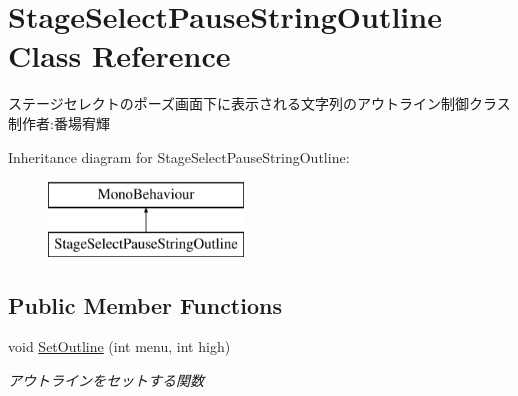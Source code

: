 \hypertarget{class_stage_select_pause_string_outline}{}\section{Stage\+Select\+Pause\+String\+Outline Class Reference}
\label{class_stage_select_pause_string_outline}


ステージセレクトのポーズ画面下に表示される文字列のアウトライン制御クラス 制作者\+:番場宥輝  


Inheritance diagram for Stage\+Select\+Pause\+String\+Outline\+:\begin{figure}[H]
\begin{center}
\leavevmode
\includegraphics[height=2.000000cm]{class_stage_select_pause_string_outline}
\end{center}
\end{figure}
\subsection*{Public Member Functions}
\begin{DoxyCompactItemize}
\item 
void \hyperlink{class_stage_select_pause_string_outline_a575ce9364ec9f4bdd5a297aeaaa2182d}{Set\+Outline} (int menu, int high)
\begin{DoxyCompactList}\small\item\em アウトラインをセットする関数 \end{DoxyCompactList}\end{DoxyCompactItemize}
